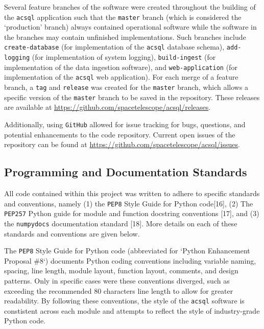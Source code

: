 \documentclass[10pt,journal,compsoc]{IEEEtran}
\begin{document}
Several feature branches of the software were created throughout the building of the \texttt{acsql} application such that the \texttt{master} branch (which is considered the
`production' branch) always contained operational software while the software in the branches may contain unfinished implementations.  Such branches include \texttt{create-database}
(for implementation of the \texttt{acsql} database schema), \texttt{add-logging} (for implementation of system logging), \texttt{build-ingest} (for implementation of the data
ingestion software), and \texttt{web-application} (for implementation of the \texttt{acsql} web application).  For each merge of a feature branch, a \texttt{tag} and \texttt{release}
was created for the \texttt{master} branch, which allows a specific version of the \texttt{master} branch to be saved in the repository.  These releases are available at
\textcolor{blue}{\url{https://github.com/spacetelescope/acsql/releases}}.

Additionally, using \texttt{GitHub} allowed for issue tracking for bugs, questions, and potential enhancements to the code repository.  Current open issues of the repository
can be found at \textcolor{blue}{\url{https://github.com/spacetelescope/acsql/issues}}.


\subsection{Programming and Documentation Standards} \label{sec3.2}

All code contained within this project was written to adhere to specific standards and conventions, namely (1) the \texttt{PEP8} Style Guide for Python code[16], (2) The
\texttt{PEP257} Python guide for module and function docstring conventions [17], and (3) the \texttt{numpydocs} documentation standard [18].  More details on each of these
standards and conventions are given below.

The \texttt{PEP8} Style Guide for Python code (abbreviated for `Python Enhancement Proposal \#8`) documents Python coding conventions including variable naming, spacing,
line length, module layout, function layout, comments, and design patterns.  Only in specific cases were these conventions diverged, such as exceeding the recommended 80 characters line
length to allow for greater readability.  By following these conventions, the style of the \texttt{acsql} software is constistent across each module and attempts to reflect the style of
industry-grade Python code.
\end{document}
